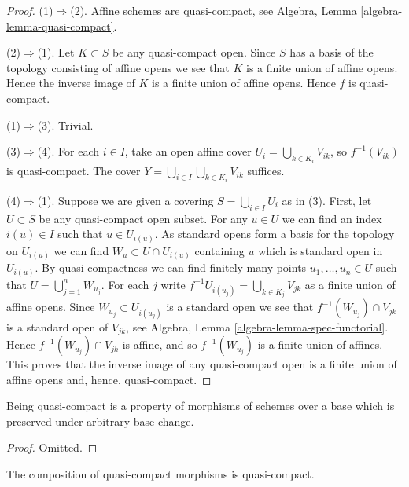 \begin{proof}
(1)$\Rightarrow$(2).
Affine schemes are quasi-compact,
see Algebra, Lemma \ref{algebra-lemma-quasi-compact}.

\medskip\noindent
(2)$\Rightarrow$(1).
Let $K \subset S$ be any quasi-compact open. Since $S$ has a basis
of the topology consisting of affine opens we see that $K$ is a finite
union of affine opens. Hence the inverse image of $K$ is a finite
union of affine opens. Hence $f$ is quasi-compact.

\medskip\noindent
(1)$\Rightarrow$(3). Trivial.

\medskip\noindent
(3)$\Rightarrow$(4).
For each $i\in I$, take an open affine cover $U_i=\bigcup_{k\in K_i}V_{ik}$,
so $f^{-1}(V_{ik})$ is quasi-compact.
The cover $Y=\bigcup_{i\in I}\bigcup_{k\in K_i}V_{ik}$ suffices.

\medskip\noindent
(4)$\Rightarrow$(1).
Suppose we are given a covering $S = \bigcup_{i \in I} U_i$ as in (3).
First, let $U \subset S$ be any quasi-compact open subset. For any $u \in U$
we can find an index $i(u) \in I$ such that $u \in U_{i(u)}$.
As standard opens form a basis for the topology on $U_{i(u)}$ we can find
$W_u \subset U \cap U_{i(u)}$ containing $u$ which is standard open in $U_{i(u)}$.
By quasi-compactness we can find finitely many points $u_1, \ldots, u_n \in U$
such that $U = \bigcup_{j = 1}^n W_{u_j}$. For each $j$ write
$f^{-1}U_{i(u_j)} = \bigcup_{k \in K_j} V_{jk}$ as a finite
union of affine opens. Since $W_{u_j} \subset U_{i(u_j)}$ is a standard
open we see that $f^{-1}(W_{u_j}) \cap V_{jk}$ is a standard
open of $V_{jk}$, see Algebra, Lemma \ref{algebra-lemma-spec-functorial}.
Hence $f^{-1}(W_{u_j}) \cap V_{jk}$ is affine, and so
$f^{-1}(W_{u_j})$ is a finite union of affines. This proves that the
inverse image of any quasi-compact open is a finite union of affine opens and,
hence, quasi-compact.
\end{proof}

\begin{lemma}
\label{lemma-quasi-compact-preserved-base-change}
Being quasi-compact is a property of morphisms of schemes
over a base which is preserved under arbitrary base change.
\end{lemma}

\begin{proof}
Omitted.
\end{proof}

\begin{lemma}
\label{lemma-composition-quasi-compact}
The composition of quasi-compact morphisms is quasi-compact.
\end{lemma}

